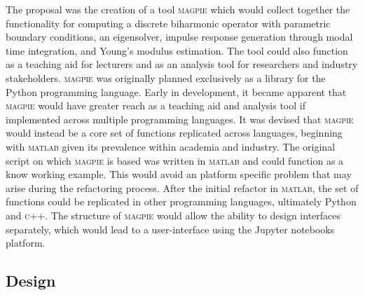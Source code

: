

The proposal was the creation of a tool \textsc{magpie} which would collect together the functionality for computing a discrete biharmonic operator with parametric boundary conditions, an eigensolver, impulse response generation through modal time integration, and Young's modulus estimation. The tool could also function as a teaching aid for lecturers and as an analysis tool for researchers and industry stakeholders. \textsc{magpie} was originally planned exclusively as a library for the Python programming language. Early in development, it became apparent that \textsc{magpie} would have greater reach as a teaching aid and analysis tool if implemented across multiple programming languages. It was devised that  \textsc{magpie} would instead be a core set of functions replicated across languages, beginning with \textsc{matlab} given its prevalence within academia and industry. The original script on which \textsc{magpie} is based was written in \textsc{matlab} and could function as a know working example. This would avoid an platform specific problem that may arise during the refactoring  process. After the initial refactor in \textsc{matlab}, the set of functions could be replicated in other programming languages, ultimately Python and \textsc{c++}. The structure of \textsc{magpie} would allow the ability to design interfaces separately, which would lead to a user-interface using the Jupyter notebooks platform.

\subsection{Design}\label{design}


